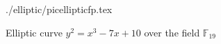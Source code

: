 \begin{figure}
\centering
 {./elliptic/picellipticfp.tex}
\caption{Elliptic curve $y^2 = x^3 -7 x + 10$ over the field
  $\mathbb{F}_{19}$}
\label{fig:add:ellipticFp}
\end{figure}
